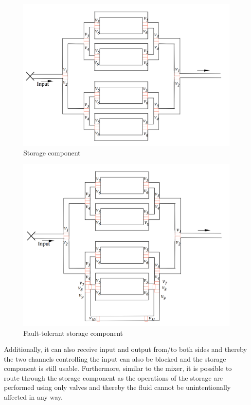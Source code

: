 \begin{figure}[H]
\centering
\includegraphics[scale=0.25]{figures/storage-valves.png}
\caption[Storage component]{Storage component}
\label{fig:storage}
\end{figure}

\begin{figure}[H]
\centering
\includegraphics[scale=0.35]{figures/fault-tolerant-storage-valves.png}
\caption[Fault-tolerant storage component]{Fault-tolerant storage component}
\label{fig:ftstorage}
\end{figure}

Additionally, it can also receive input and output from/to both sides and thereby the two channels controlling the input can also be blocked and the storage component is still usable. Furthermore, similar to the mixer, it is possible to route through the storage component as the operations of the storage are performed using only valves and thereby the fluid cannot be unintentionally affected in any way.


